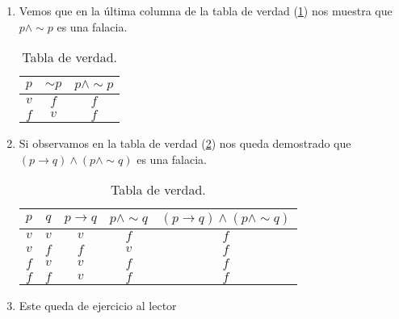 \solucion
\begin{enumerate}
\item Vemos que en la última columna de la tabla de verdad (\ref{fal1})
nos muestra que $p\wedge\sim p$ es una falacia. 
\begin{table}[H]
\centering

\caption{Tabla de verdad.}
\label{fal1}

\begin{tabular}{c|c|c}
\arrayrulecolor{ptctitle}\cellcolor{ptctitle!50}$p$ & \cellcolor{ptctitle!50}$\sim p$ & \cellcolor{ptctitle!50}$p\wedge\sim p$\tabularnewline
\hline 
\cellcolor{ptcbackground} $v$ & \cellcolor{ptcbackground}$f$ & \cellcolor{ptcbackground}$f$\tabularnewline
\hline 
\cellcolor{gray!50}$f$ & \cellcolor{gray!50} $v$ & \cellcolor{gray!50}$f$\tabularnewline
\hline 
\end{tabular}
\end{table}

\item Si observamos en la tabla de verdad (\ref{fal2}) nos queda demostrado
que $(p\rightarrow q)\wedge\left(p\wedge\sim q\right)$ es una falacia.
\begin{table}[H]
\centering

\caption{Tabla de verdad.}
\label{fal2}

\begin{tabular}{c|c|c|c|c}
\arrayrulecolor{ptctitle}\cellcolor{ptctitle!50}$p$ & \cellcolor{ptctitle!50}$q$ & \cellcolor{ptctitle!50}$p\rightarrow q$ & \cellcolor{ptctitle!50}$p\wedge\sim q$ & \cellcolor{ptctitle!50}$(p\rightarrow q)\wedge\left(p\wedge\sim q\right)$\tabularnewline
\hline 
\cellcolor{ptcbackground} $v$ & \cellcolor{ptcbackground}$v$ & \cellcolor{ptcbackground}$v$ & \cellcolor{ptcbackground}$f$ & \cellcolor{ptcbackground}$f$\tabularnewline
\hline 
\cellcolor{gray!50}$v$ & \cellcolor{gray!50} $f$ & \cellcolor{gray!50}$f$ & \cellcolor{gray!50}$v$ & \cellcolor{gray!50}$f$\tabularnewline
\hline 
\cellcolor{ptcbackground}$f$ & \cellcolor{ptcbackground} $v$ & \cellcolor{ptcbackground} $v$ & \cellcolor{ptcbackground}$f$ & \cellcolor{ptcbackground}$f$\tabularnewline
\hline 
\cellcolor{gray!50} $f$ & \cellcolor{gray!50} $f$ & \cellcolor{gray!50} $v$ & \cellcolor{gray!50}$f$ & \cellcolor{gray!50}$f$\tabularnewline
\hline 
\end{tabular}
\end{table}

\item Este queda de ejercicio al lector
\end{enumerate}


